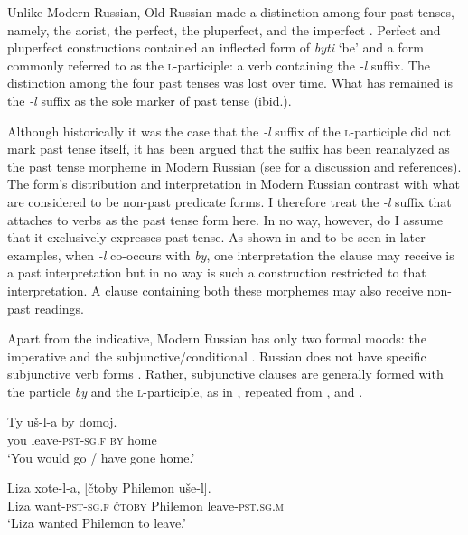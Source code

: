 \documentclass[output=paper,
modfonts,
newtxmath,
hidelinks,
]{langscibook}
\begin{document}
\noindent Unlike Modern Russian, Old Russian made a distinction among four past tenses, namely, the aorist, the perfect, the pluperfect, and the imperfect \citep[38]{Mezhevich2006}. Perfect and pluperfect constructions contained an inflected form of \textit{byti} ‘be’ and a form commonly referred to as the \textsc{l}-participle: a verb containing the \textit{-l} suffix. The distinction among the four past tenses was lost over time. What has remained is the \textit{-l} suffix as the sole marker of past tense (ibid.).

Although historically it was the case that the \textit{-l} suffix of the \textsc{l}-participle did not mark past tense itself, it has been argued that the suffix has been reanalyzed as the past tense morpheme in Modern Russian (see \citealt{Mezhevich2006} for a discussion and references). The form’s distribution and interpretation in Modern Russian contrast with what are considered to be non-past predicate forms. I therefore treat the \textit{-l} suffix that attaches to verbs as the past tense form here. In no way, however, do I assume that it exclusively expresses past tense. As shown in  and to be seen in later examples, when \textit{{}-}\textit{l\-} co-occurs with \textit{by}, one interpretation the clause may receive is a past interpretation but in no way is such a construction restricted to that interpretation. A clause containing both these morphemes may also receive non-past readings.

Apart from the indicative, Modern Russian has only two formal moods: the imperative and the subjunctive/conditional \citep[157]{Cubberley2002}. Russian does not have specific subjunctive verb forms \citep[118]{Mezhevich2006}. Rather, subjunctive clauses are generally formed with the particle \textit{by} and the \textsc{l}-participle, as in , repeated from , and .

\ea \label{10:ex5}
\gll Ty uš-l-a by domoj.\\
     you leave\textsc{-pst-sg.f} \textsc{by} home\\
\glt `You would go / have gone home.' \hfill \citep[152]{Mezhevich2006}
\z

\ea \label{10:ex6}
\gll Liza xote-l-a, [čtoby Philemon uše-l].\\
     Liza want\textsc{-pst-sg.f} { }\textsc{čtoby} Philemon leave-\textsc{pst.sg.m}\\
\glt `Liza wanted Philemon to leave.' \hfill \citep[148]{Mezhevich2006}
\z
\end{document}
